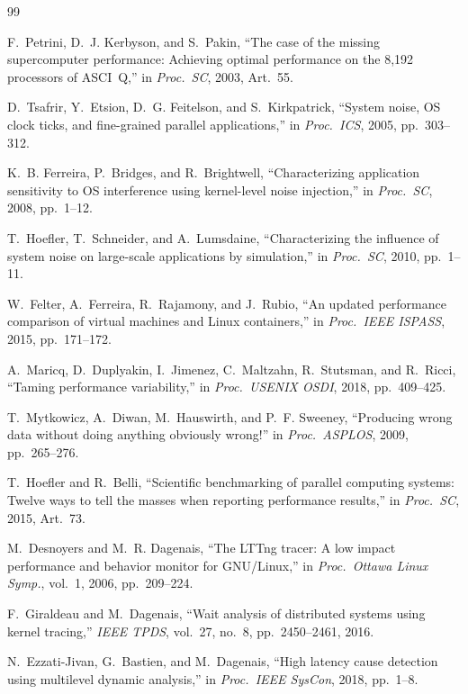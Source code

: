\begin{thebibliography}{99}

F.~Petrini, D.~J. Kerbyson, and S.~Pakin, ``The case of the missing
supercomputer performance: Achieving optimal performance on the 8,192
processors of ASCI~Q,'' in \emph{Proc.\ SC}, 2003, Art.~55.

D.~Tsafrir, Y.~Etsion, D.~G. Feitelson, and S.~Kirkpatrick, ``System noise,
OS clock ticks, and fine-grained parallel applications,'' in \emph{Proc.\ ICS}, 2005, pp.\ 303--312.

K.~B. Ferreira, P.~Bridges, and R.~Brightwell, ``Characterizing application
sensitivity to OS interference using kernel-level noise injection,'' in \emph{Proc.\ SC}, 2008, pp.\ 1--12.

T.~Hoefler, T.~Schneider, and A.~Lumsdaine, ``Characterizing the influence
of system noise on large-scale applications by simulation,'' in \emph{Proc.\ SC}, 2010, pp.\ 1--11.

W.~Felter, A.~Ferreira, R.~Rajamony, and J.~Rubio, ``An updated performance
comparison of virtual machines and Linux containers,'' in \emph{Proc.\ IEEE ISPASS}, 2015, pp.\ 171--172.

A.~Maricq, D.~Duplyakin, I.~Jimenez, C.~Maltzahn, R.~Stutsman, and R.~Ricci,
``Taming performance variability,'' in \emph{Proc.\ USENIX OSDI}, 2018, pp.\ 409--425.

T.~Mytkowicz, A.~Diwan, M.~Hauswirth, and P.~F. Sweeney, ``Producing wrong
data without doing anything obviously wrong!'' in \emph{Proc.\ ASPLOS}, 2009, pp.\ 265--276.

T.~Hoefler and R.~Belli, ``Scientific benchmarking of parallel computing
systems: Twelve ways to tell the masses when reporting performance
results,'' in \emph{Proc.\ SC}, 2015, Art.~73.

M.~Desnoyers and M.~R. Dagenais, ``The LTTng tracer: A low impact
performance and behavior monitor for GNU/Linux,'' in \emph{Proc.\ Ottawa Linux Symp.}, vol.~1, 2006, pp.\ 209--224.

F.~Giraldeau and M.~Dagenais, ``Wait analysis of distributed systems using
kernel tracing,'' \emph{IEEE TPDS}, vol.~27, no.~8, pp.\ 2450--2461, 2016.

N.~Ezzati-Jivan, G.~Bastien, and M.~Dagenais, ``High latency cause
detection using multilevel dynamic analysis,'' in \emph{Proc.\ IEEE SysCon}, 2018, pp.\ 1--8.


\end{thebibliography}
